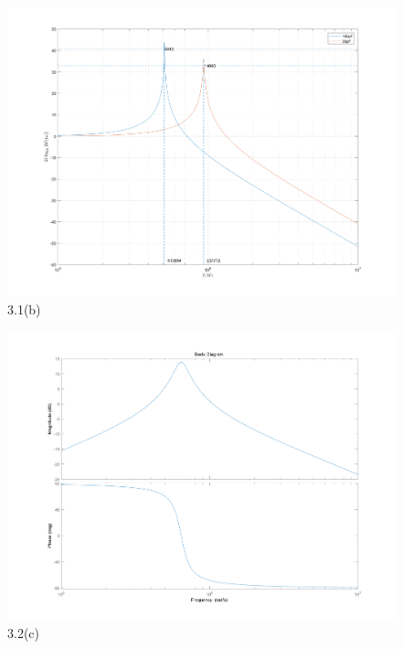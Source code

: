 \documentclass{article}
\begin{document}
\begin{figure}
\centering
\includegraphics[width=1\linewidth]{prelab1.png}
\caption{3.1(b)}
\end{figure}
\begin{figure}
\centering
\includegraphics[width=1\linewidth]{prelab2.png}
\caption{3.2(c)}
\end{figure}
\end{document}
